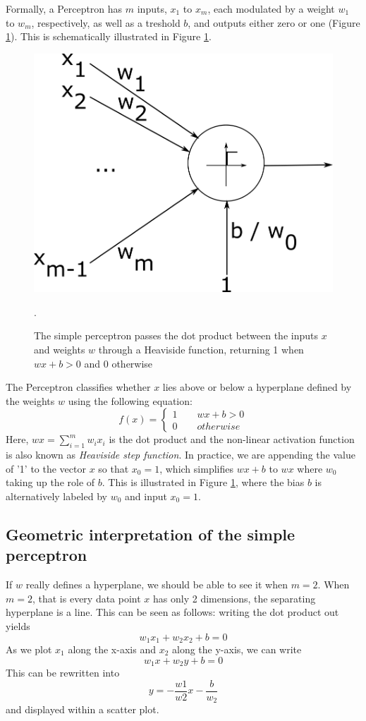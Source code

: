 \documentclass[paper=6.14in:9.21in,pagesize=pdftex,11pt,twoside,openright]{scrbook}
\begin{document}
Formally, a Perceptron has $m$ inputs, $x_1$ to $x_m$, each modulated by a weight $w_1$ to $w_m$, respectively, as well as a treshold $b$, and outputs either zero or one (Figure \ref{fig:perceptron}). This is schematically illustrated in Figure \ref{fig:perceptron}.

\begin{figure}[!htb]
\centering
\includegraphics[width=0.5\columnwidth]{figs/perceptron.png}
\caption{The simple perceptron passes the dot product between the inputs $x$ and weights $w$ through a Heaviside function, returning 1 when $wx+b>0$ and 0 otherwise\label{fig:perceptron}}.
\end{figure}

The Perceptron classifies whether $x$ lies above or below a hyperplane defined by the weights $w$ using the following equation:
%
\begin{equation}
f(x)=\begin{cases}
1 \qquad wx+b > 0\\
0 \qquad otherwise
\end{cases}
\end{equation}
%
Here, $wx=\sum_{i=1}^mw_ix_i$ is the dot product and the non-linear activation function is also known as \emph{Heaviside step function}. In practice, we are appending the value of '1' to the vector $x$ so that $x_0=1$, which simplifies $wx+b$ to $wx$ where $w_0$ taking up the role of $b$. This is illustrated in Figure \ref{fig:perceptron}, where the bias $b$ is alternatively labeled by $w_0$ and input $x_0=1$.


\subsection{Geometric interpretation of the simple perceptron}
If $w$ really defines a hyperplane, we should be able to see it when $m=2$. When $m=2$, that is every data point $x$ has only 2 dimensions, the separating hyperplane is a line. This can be seen as follows: writing the dot product out yields
\begin{equation}
w_1x_1+w_2x_2+b=0
\end{equation}
As we plot $x_1$ along the x-axis and $x_2$ along the y-axis, we can write
\begin{equation}
w_1x+w_2y+b=0
\end{equation}
This can be rewritten into
\begin{equation}
y=-\frac{w1}{w2}x-\frac{b}{w_2}
\end{equation}
and displayed within a scatter plot.
\end{document}
